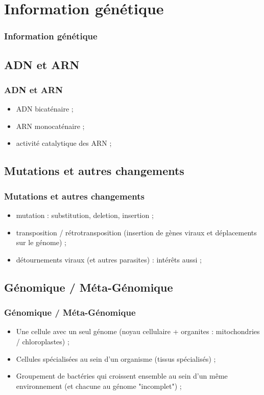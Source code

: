\documentclass{beamer}
\begin{document}

\section{Information g{\'e}n{\'e}tique }
\begin{frame}
	\frametitle{Information g{\'e}n{\'e}tique }
	\tableofcontents[sections=4,currentsection,subsectionstyle=show/shaded/hide]
\end{frame} 

\subsection{ ADN et ARN }
\begin{frame}
	\frametitle{ ADN et ARN }
	\begin{itemize}
		\item ADN bicat{\'e}naire ; 
		\item ARN monocat{\'e}naire ; 
		\item activit{\'e} catalytique des ARN ; 
	\end{itemize}
\end{frame}

\subsection{ Mutations et autres changements }
\begin{frame}
	\frametitle{ Mutations et autres changements }
	\begin{itemize}
		\item mutation : substitution, deletion, insertion ; 
		\item transposition / r{\'e}trotransposition (insertion de g{\`e}nes viraux et d{\'e}placements sur le g{\'e}nome) ; 
		\item d{\'e}tournements viraux (et autres parasites) : int{\'e}r{\^e}ts aussi ; 
	\end{itemize}
\end{frame}

\subsection{ G{\'e}nomique / M{\'e}ta-G{\'e}nomique }
\begin{frame}
	\frametitle{ G{\'e}nomique / M{\'e}ta-G{\'e}nomique }
	\begin{itemize}
		\item Une cellule avec un seul g{\'e}nome (noyau cellulaire + organites : mitochondries / chloroplastes) ; 
		\item Cellules sp{\'e}cialis{\'e}es au sein d'un organisme (tissus sp{\'e}cialis{\'e}s) ; 
		\item Groupement de bact{\'e}ries qui croissent ensemble au sein d'un m{\^e}me environnement (et chacune au g{\'e}nome "incomplet") ; 
	\end{itemize}
\end{frame}
\end{document}
